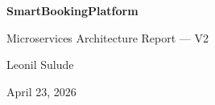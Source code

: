 \documentclass[12pt, a4paper]{article}
\begin{document}
\begin{titlepage}
    \centering
    \vspace*{2cm}
    {\Huge\bfseries SmartBookingPlatform\par}
    \vspace{0.5cm}
    {\Large Microservices Architecture Report --- V2\par}
    \vspace{2cm}
    {\large Leonil Sulude\par}
    \vspace{0.5cm}
    {\large April 23, 2026\par}
    \vfill
\end{titlepage}

\tableofcontents
\newpage


\newpage


\newpage


\newpage


\newpage


\newpage


\newpage


\newpage


\newpage


\newpage


\newpage


\newpage


\newpage


\end{document}
